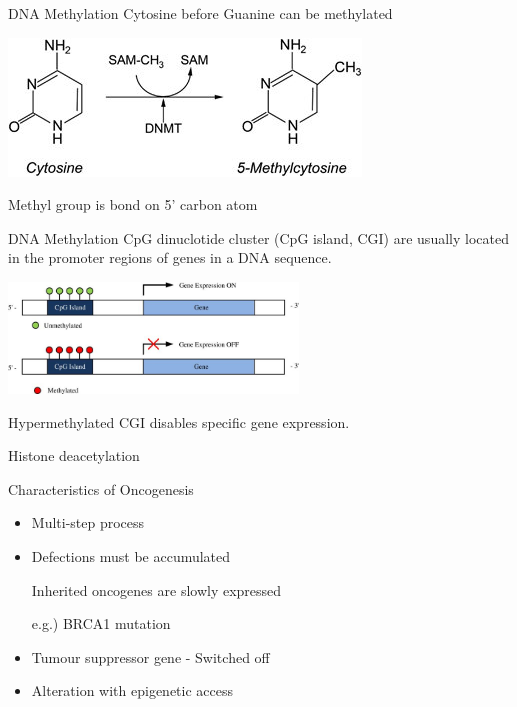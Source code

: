 \documentclass{beamer}
\begin{document}
    \begin{frame}{DNA Methylation}
        Cytosine before Guanine can be methylated

        \begin{center}
            \includegraphics{5mc.png}
        \end{center}

        Methyl group is bond on 5' carbon atom
    \end{frame}

    \begin{frame}{DNA Methylation}
        CpG dinuclotide cluster (CpG island, CGI) are usually located in the promoter regions of genes in a DNA sequence.
        \begin{center}
            \includegraphics[height=8em]{1}
        \end{center}
        Hypermethylated CGI disables specific gene expression.
    \end{frame}

    \begin{frame}{Histone deacetylation}

    \end{frame}

    \begin{frame}{Characteristics of Oncogenesis}
        \begin{itemize}
            \item Multi-step process
            \item Defections must be accumulated
                  
                  \vspace{1em}
                  {\small Inherited oncogenes are slowly expressed 
                  
                  e.g.) BRCA1 mutation}
                  \vspace{1em}

            \item Tumour suppressor gene - Switched off
            \item Alteration with epigenetic access
        \end{itemize}
    \end{frame}
\end{document}
